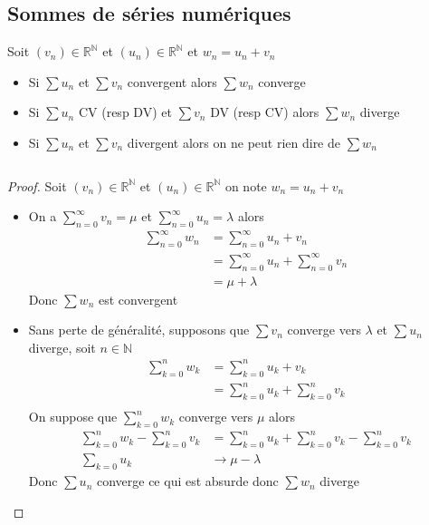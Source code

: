 \documentclass[11pt,colorlinks]{book}
\theoremstyle{mytheoremstyle}
\theoremstyle{mytheoremstyle}
\theoremstyle{mytheoremstyle}
\theoremstyle{mytheoremstyle}
\theoremstyle{mytheoremstyle}
\theoremstyle{mytheoremstyle}
\theoremstyle{mytheoremstyle}
\theoremstyle{mytheoremstyle}
\theoremstyle{myproblemstyle}
\def\mbb#1{\mathbb{#1}}
\def\bN{\mbb{N}}
\def\bR{\mbb{R}}
\def\rN{\bR^{\bN}}
\begin{document}
\subsection{Sommes de séries numériques}
\begin{prop}[Somme]
  Soit $(v_n) \in \rN$ et $(u_n) \in \rN$ et $w_n = u_n + v_n$ 
  \begin{itemize}
    \item Si $\sum u_n$ et $\sum v_n$ convergent alors $\sum w_n$ converge
    \item Si $\sum u_n$ CV (resp DV) et $\sum v_n$ DV (resp CV) alors $\sum w_n$ diverge
    \item Si $\sum u_n$ et $\sum v_n$ divergent alors on ne peut rien dire de $\sum w_n$
  \end{itemize}
  $ $
  \begin{proof}
    Soit $(v_n) \in \rN$ et $(u_n) \in \rN$ on note $w_n = u_n + v_n$
    \begin{itemize}
      \item On a $\sum_{n=0}^{\infty} v_n = \mu$ et $\sum_{n=0}^{\infty} u_n = \lambda$ alors 
      \begin{align*}
        \sum_{n=0}^{\infty} w_n &= \sum_{n=0}^{\infty} u_n+v_n \\ 
        &= \sum_{n=0}^{\infty} u_n + \sum_{n=0}^{\infty} v_n \\
        &= \mu + \lambda
      \end{align*}
      Donc $\sum w_n$ est convergent
      \item Sans perte de généralité, supposons que $\sum v_n$ converge vers $\lambda$ et $\sum u_n$ diverge, soit $n\in \bN$ 
      \begin{align*}
        \sum_{k=0}^n w_k &= \sum_{k=0}^n u_k + v_k \\ 
        &= \sum_{k=0}^n u_k + \sum_{k=0}^n v_k \\ 
      \end{align*}
      On suppose que $\sum_{k=0}^n w_k$ converge vers $\mu$ alors 
      \begin{align*}
        \sum_{k=0}^n w_k - \sum_{k=0}^n v_k &= \sum_{k=0}^n u_k + \sum_{k=0}^n v_k - \sum_{k=0}^n v_k \\ 
        \sum_{k=0} u_k &\to \mu - \lambda
      \end{align*}
      Donc $\sum u_n$ converge ce qui est absurde donc $\sum w_n$ diverge
    \end{itemize}
  \end{proof}
\end{prop}
\end{document}

